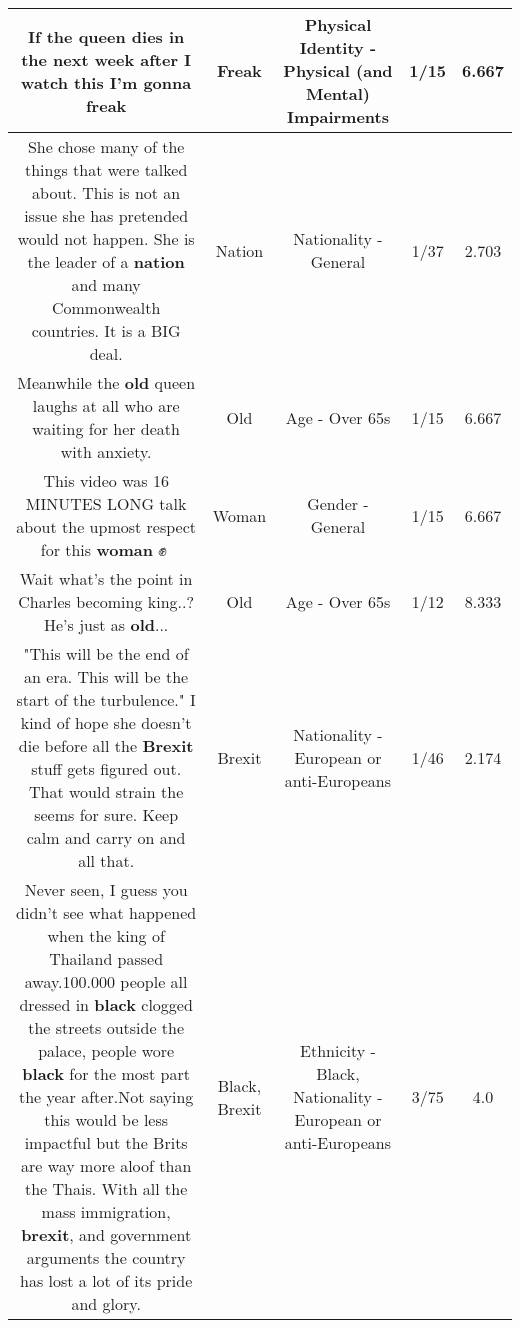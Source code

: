 \documentclass[11pt]{article}
\newlength\mylength
\begin{document}
\begin{center}
\begin{longtable}{|C{.65\mylength}|C{.30\mylength}|C{.12\mylength}|C{.12\mylength}|C{.12\mylength}|}
  \small If the queen dies in the next week after I watch this I'm gonna freak\normalsize   & Freak & Physical Identity - Physical (and Mental) Impairments & 1/15 & 6.667 \\  \hline
  \small She chose many of the things that were talked about.  This is not an issue she has pretended would not happen.  She is the leader of a \textbf{nation} and many Commonwealth countries.  It is a BIG deal.\normalsize   & Nation & Nationality - General & 1/37 & 2.703 \\  \hline
  \small Meanwhile the \textbf{old} queen laughs at all who are waiting for her death with anxiety.\normalsize   & Old & Age - Over 65s & 1/15 & 6.667 \\  \hline
  \small This video was 16 MINUTES LONG talk about the upmost respect for this \textbf{woman} ✊💖\normalsize   & Woman & Gender - General & 1/15 & 6.667 \\  \hline
  \small Wait what's the point in Charles becoming king..? He's just as \textbf{old}...\normalsize   & Old & Age - Over 65s & 1/12 & 8.333 \\  \hline
  \small "This will be the end of an era. This will be the start of the turbulence." I kind of hope she doesn't die before all the \textbf{Brexit} stuff gets figured out. That would strain the seems for sure. Keep calm and carry on and all that.\normalsize   & Brexit & Nationality - European or anti-Europeans & 1/46 & 2.174 \\  \hline
  \small Never seen, I guess you didn't see what happened when the king of Thailand passed away.100.000 people all dressed in \textbf{black} clogged the streets outside the palace, people wore \textbf{black} for the most part the year after.Not saying this would be less impactful but the Brits are way more aloof than the Thais. With all the mass immigration, \textbf{brexit}, and government arguments the country has lost a lot of its pride and glory.\normalsize   & Black, Brexit & Ethnicity - Black, Nationality - European or anti-Europeans & 3/75 & 4.0 \\  \hline

\end{longtable}
\end{center}
\end{document}
